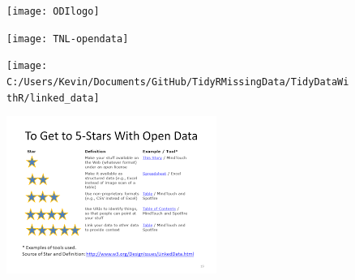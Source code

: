 \documentclass[TIDYMASTER.tex]{subfiles}
\begin{document}
 
\begin{frame}
	\begin{figure}
\centering
\texttt{[image: ODIlogo]}
\end{figure}

\end{frame}
\begin{frame}
	\begin{figure}
\centering
\texttt{[image: TNL-opendata]}
\end{figure}

\end{frame}
\begin{frame}
	
\begin{figure}
\centering
\texttt{[image: C:/Users/Kevin/Documents/GitHub/TidyRMissingData/TidyDataWithR/linked\_data]}
\end{figure}

\end{frame}
\begin{frame}
	
	\begin{figure}
\centering
\includegraphics[width=1.1\linewidth]{OpenData1}
\end{figure}

\end{frame}
\end{document}
